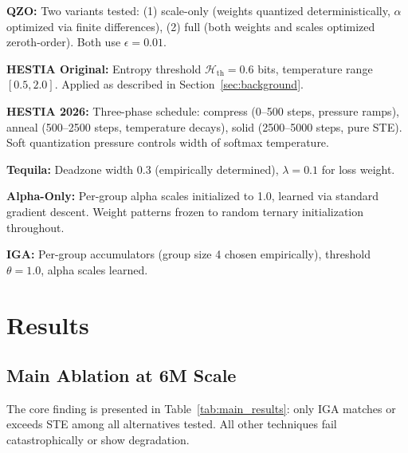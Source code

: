 \documentclass{article}
\begin{document}
\textbf{QZO:} Two variants tested: (1) scale-only (weights quantized deterministically, $\alpha$ optimized via finite differences), (2) full (both weights and scales optimized zeroth-order). Both use $\epsilon = 0.01$.

\textbf{HESTIA Original:} Entropy threshold $\mathcal{H}_\text{th} = 0.6$ bits, temperature range $[0.5, 2.0]$. Applied as described in Section~\ref{sec:background}.

\textbf{HESTIA 2026:} Three-phase schedule: compress (0--500 steps, pressure ramps), anneal (500--2500 steps, temperature decays), solid (2500--5000 steps, pure STE). Soft quantization pressure controls width of softmax temperature.

\textbf{Tequila:} Deadzone width 0.3 (empirically determined), $\lambda = 0.1$ for loss weight.

\textbf{Alpha-Only:} Per-group alpha scales initialized to 1.0, learned via standard gradient descent. Weight patterns frozen to random ternary initialization throughout.

\textbf{IGA:} Per-group accumulators (group size 4 chosen empirically), threshold $\theta = 1.0$, alpha scales learned.

\section{Results}

\subsection{Main Ablation at 6M Scale}

The core finding is presented in Table~\ref{tab:main_results}: only IGA matches or exceeds STE among all alternatives tested. All other techniques fail catastrophically or show degradation.
\end{document}
